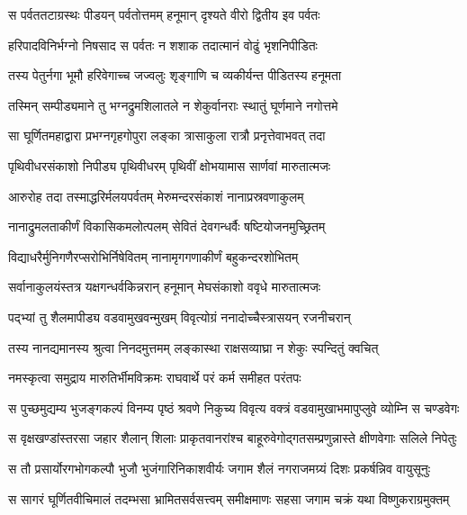 \twolineshloka
{स पर्वततटाग्रस्थः पीडयन् पर्वतोत्तमम्}
{हनूमान् दृश्यते वीरो द्वितीय इव पर्वतः} %

\twolineshloka
{हरिपादविनिर्भग्नो निषसाद स पर्वतः}
{न शशाक तदात्मानं वोढुं भृशनिपीडितः} %

\twolineshloka
{तस्य पेतुर्नगा भूमौ हरिवेगाच्च जज्वलुः}
{शृङ्गाणि च व्यकीर्यन्त पीडितस्य हनूमता} %

\twolineshloka
{तस्मिन् सम्पीड्यमाने तु भग्नद्रुमशिलातले}
{न शेकुर्वानराः स्थातुं घूर्णमाने नगोत्तमे} %

\twolineshloka
{सा घूर्णितमहाद्वारा प्रभग्नगृहगोपुरा}
{लङ्का त्रासाकुला रात्रौ प्रनृत्तेवाभवत् तदा} %

\twolineshloka
{पृथिवीधरसंकाशो निपीड्य पृथिवीधरम्}
{पृथिवीं क्षोभयामास सार्णवां मारुतात्मजः} %

\twolineshloka
{आरुरोह तदा तस्माद्धरिर्मलयपर्वतम्}
{मेरुमन्दरसंकाशं नानाप्रस्रवणाकुलम्} %

\twolineshloka
{नानाद्रुमलताकीर्णं विकासिकमलोत्पलम्}
{सेवितं देवगन्धर्वैः षष्टियोजनमुच्छ्रितम्} %

\twolineshloka
{विद्याधरैर्मुनिगणैरप्सरोभिर्निषेवितम्}
{नानामृगगणाकीर्णं बहुकन्दरशोभितम्} %

\twolineshloka
{सर्वानाकुलयंस्तत्र यक्षगन्धर्वकिन्नरान्}
{हनूमान् मेघसंकाशो ववृधे मारुतात्मजः} %

\twolineshloka
{पद्भ्यां तु शैलमापीड्य वडवामुखवन्मुखम्}
{विवृत्योग्रं ननादोच्चैस्त्रासयन् रजनीचरान्} %

\twolineshloka
{तस्य नानद्यमानस्य श्रुत्वा निनदमुत्तमम्}
{लङ्कास्था राक्षसव्याघ्रा न शेकुः स्पन्दितुं क्वचित्} %

\twolineshloka
{नमस्कृत्वा समुद्राय मारुतिर्भीमविक्रमः}
{राघवार्थे परं कर्म समीहत परंतपः} %

\twolineshloka
{स पुच्छमुद्यम्य भुजङ्गकल्पं विनम्य पृष्ठं श्रवणे निकुच्य}
{विवृत्य वक्त्रं वडवामुखाभमापुप्लुवे व्योम्नि स चण्डवेगः} %

\twolineshloka
{स वृक्षखण्डांस्तरसा जहार शैलान् शिलाः प्राकृतवानरांश्च}
{बाहूरुवेगोद्गतसम्प्रणुन्नास्ते क्षीणवेगाः सलिले निपेतुः} %

\twolineshloka
{स तौ प्रसार्योरगभोगकल्पौ भुजौ भुजंगारिनिकाशवीर्यः}
{जगाम शैलं नगराजमग्र्यं दिशः प्रकर्षन्निव वायुसूनुः} %

\twolineshloka
{स सागरं घूर्णितवीचिमालं तदम्भसा भ्रामितसर्वसत्त्वम्}
{समीक्षमाणः सहसा जगाम चक्रं यथा विष्णुकराग्रमुक्तम्} %

